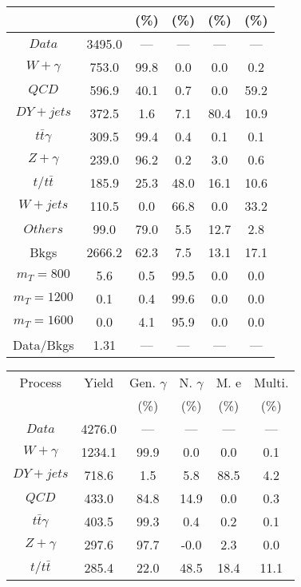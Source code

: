 \begin{figure}
\begin{minipage}[c]{0.32\textwidth}
{\begin{tabular}{cccccc}
 &  & (\%) & (\%) & (\%) & (\%)  \\
\hline
                                                                      $ Data $ &  3495.0 &  --- &  --- &  --- &  ---\\
$ W+\gamma $ &  753.0 &  99.8 &  0.0 &  0.0 &  0.2\\
$ QCD $ &  596.9 &  40.1 &  0.7 &  0.0 &  59.2\\
$ DY+jets $ &  372.5 &  1.6 &  7.1 &  80.4 &  10.9\\
$ t\bar{t}\gamma $ &  309.5 &  99.4 &  0.4 &  0.1 &  0.1\\
$ Z+\gamma $ &  239.0 &  96.2 &  0.2 &  3.0 &  0.6\\
$ t/t\bar{t} $ &  185.9 &  25.3 &  48.0 &  16.1 &  10.6\\
$ W+jets $ &  110.5 &  0.0 &  66.8 &  0.0 &  33.2\\
$ Others $ &  99.0 &  79.0 &  5.5 &  12.7 &  2.8\\
Bkgs &  2666.2 &  62.3 &  7.5 &  13.1 &  17.1\\
$ m_{T} = 800 $ &  5.6 &  0.5 &  99.5 &  0.0 &  0.0\\
$ m_{T} = 1200 $ &  0.1 &  0.4 &  99.6 &  0.0 &  0.0\\
$ m_{T} = 1600 $ &  0.0 &  4.1 &  95.9 &  0.0 &  0.0\\
Data/Bkgs &  1.31 &  --- &  --- &  --- &  ---\\
\hline
\end{tabular}
}
\end{minipage}
\begin{minipage}[c]{0.32\textwidth}
\centering
\tiny{
\begin{tabular}{cccccc}
\hline
Process & Yield & Gen. $\gamma$ & N. $\gamma$ & M. e & Multi. \\
 &  & (\%) & (\%) & (\%) & (\%)  \\
\hline
                                                                      $ Data $ &  4276.0 &  --- &  --- &  --- &  ---\\
$ W+\gamma $ &  1234.1 &  99.9 &  0.0 &  0.0 &  0.1\\
$ DY+jets $ &  718.6 &  1.5 &  5.8 &  88.5 &  4.2\\
$ QCD $ &  433.0 &  84.8 &  14.9 &  0.0 &  0.3\\
$ t\bar{t}\gamma $ &  403.5 &  99.3 &  0.4 &  0.2 &  0.1\\
$ Z+\gamma $ &  297.6 &  97.7 &  -0.0 &  2.3 &  0.0\\
$ t/t\bar{t} $ &  285.4 &  22.0 &  48.5 &  18.4 &  11.1\\

\end{tabular}}
\end{minipage}
\end{figure}
